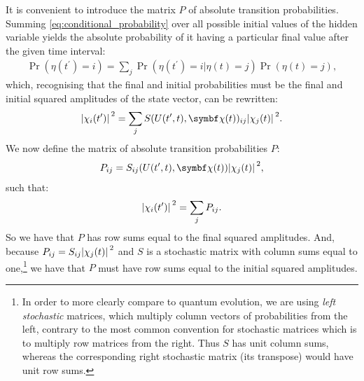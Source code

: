 It is convenient to introduce the matrix $P$ of absolute transition probabilities. Summing \eqref{eq:conditional_probability} over all possible initial values of the hidden variable yields the absolute probability of it having a particular final value after the given time interval:
\begin{align}
\Pr(\eta(t^\prime){=}i) 
= \sum_j \Pr(\eta(t^\prime){=}i|\eta(t){=}j) \Pr(\eta(t){=}j),
\end{align}
which, recognising that the final and initial probabilities must be the final and initial squared amplitudes of the state vector, can be rewritten:
\begin{align}
\abs{\chi_i(t^\prime)}^2
= \sum_j S(U(t^\prime, t), \vec\chi(t))_{ij} \abs{\chi_j(t)}^2.
\end{align}
We now define the matrix of absolute transition probabilities $P$:
\begin{align}\label{eq:P_matrix_def}
P_{ij} = S_{ij}(U(t^\prime, t), \vec\chi(t)) \abs{\chi_j(t)}^2,
\end{align}
such that:
\begin{align}
\abs{\chi_i(t^\prime)}^2
= \sum_j P_{ij}.
\end{align}
So we have that $P$ has row sums equal to the final squared amplitudes.
And, because $P_{ij} = S_{ij}\abs{\chi_j(t)}^2$ and $S$ is a stochastic matrix with column sums equal to one,\footnote{In order to more clearly compare to quantum evolution, we are using \emph{left stochastic} matrices, which multiply column vectors of probabilities from the left, contrary to the most common convention for stochastic matrices which is to multiply row matrices from the right. Thus $S$ has unit column sums, whereas the corresponding right stochastic matrix (its transpose) would have unit row sums.} we have that $P$ must have row sums equal to the initial squared amplitudes.

